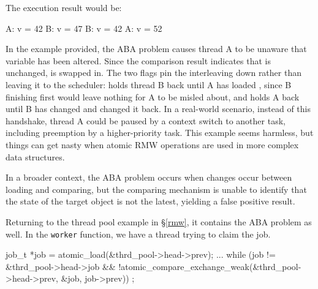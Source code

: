 \documentclass[fontsize=10pt, oneside]{scrartcl}
\newcommand{\monobox}[1]{\mbox{\texttt{#1}}}
\newcommand{\secref}[1]{\hyperref[#1]{\textsc{\S}\ref*{#1}}}
\begin{document}
\inputminted{c}{./examples/simple_aba_example.c}

The execution result would be:

\begin{ccode}
    A: v = 42
    B: v = 47
    B: v = 42
    A: v = 52
\end{ccode}

In the example provided, the ABA problem causes thread A to be unaware that variable  has been altered.
Since the comparison result indicates that  is unchanged,  is swapped in.
The two flags pin the interleaving down rather than leaving it to the scheduler:
 holds thread B back until A has loaded ,
since B finishing first would leave nothing for A to be misled about,
and  holds A back until B has changed  and changed it back.
In a real-world scenario, instead of this handshake, thread A could be paused by a context switch to another task, including preemption by a higher-priority task.
This example seems harmless, but things can get nasty when atomic \textsc{RMW} operations are used in more complex data structures.

In a broader context, the ABA problem occurs when changes occur between loading and comparing, but the comparing mechanism is unable to identify that the state of the target object is not the latest, yielding a false positive result.

Returning to the thread pool example in \secref{rmw}, it contains the ABA problem as well.
In the \monobox{worker} function, we have a thread trying to claim the job.

\begin{ccode}
    job_t *job = atomic_load(&thrd_pool->head->prev);
    ...
    while (job != &thrd_pool->head->job &&
           !atomic_compare_exchange_weak(&thrd_pool->head->prev, &job,
                                         job->prev))
        ;
\end{ccode}
\end{document}
